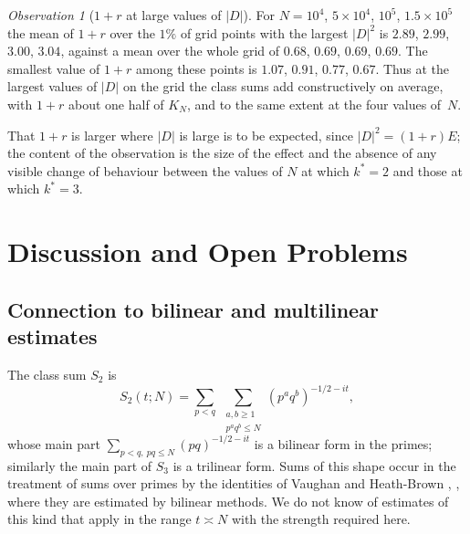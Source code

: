 \documentclass[11pt]{amsart}
\theoremstyle{definition}
\theoremstyle{remark}
\newtheorem{observation}[theorem]{Observation}
\begin{document}
\begin{observation}[$1+r$ at large values of $|D|$]
\label{obs:peaks}
For $N=10^4$, $5\times10^4$, $10^5$, $1.5\times10^5$ the mean of $1+r$
over the $1\%$ of grid points with the largest $|D|^2$ is $2.89$, $2.99$,
$3.00$, $3.04$, against a mean over the whole grid of $0.68$, $0.69$,
$0.69$, $0.69$.  The smallest value of $1+r$ among these points is $1.07$,
$0.91$, $0.77$, $0.67$.  Thus at the largest values of $|D|$ on the grid
the class sums add constructively on average, with $1+r$ about one half
of $K_N$, and to the same extent at the four values of~$N$.
\end{observation}

That $1+r$ is larger where $|D|$ is large is to be expected, since
$|D|^2=(1+r)E$; the content of the observation is the size of the effect
and the absence of any visible change of behaviour between the values of
$N$ at which $k^*=2$ and those at which $k^*=3$.

\section{Discussion and Open Problems}\label{sec:discussion}

\subsection{Connection to bilinear and multilinear estimates}

The class sum $S_2$ is
\[
  S_2(t;N) = \sum_{p<q}\ \sum_{\substack{a,b\ge1\\ p^aq^b\le N}}
  (p^aq^b)^{-1/2-it},
\]
whose main part $\sum_{p<q,\ pq\le N}(pq)^{-1/2-it}$ is a bilinear form in
the primes; similarly the main part of $S_3$ is a trilinear form.  Sums of
this shape occur in the treatment of sums over primes by the identities of
Vaughan and Heath-Brown \cite{heath-brown1982},
\cite[Chapter~13]{iwaniec-kowalski2004}, where they are estimated by
bilinear methods.  We do not know of estimates of this kind that apply in
the range $t\asymp N$ with the strength required here.
\end{document}
